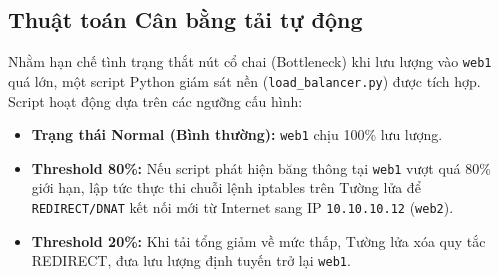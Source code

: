 \subsection{Thuật toán Cân bằng tải tự động}
Nhằm hạn chế tình trạng thắt nút cổ chai (Bottleneck) khi lưu lượng vào \texttt{web1} quá lớn, một script Python giám sát nền (\texttt{load\_balancer.py}) được tích hợp. Script hoạt động dựa trên các ngưỡng cấu hình:
\begin{itemize}
    \item \textbf{Trạng thái Normal (Bình thường):} \texttt{web1} chịu 100\% lưu lượng.
    \item \textbf{Threshold 80\%:} Nếu script phát hiện băng thông tại \texttt{web1} vượt quá 80\% giới hạn, lập tức thực thi chuỗi lệnh iptables trên Tường lửa để \texttt{REDIRECT/DNAT} kết nối mới từ Internet sang IP \texttt{10.10.10.12} (\texttt{web2}).
    \item \textbf{Threshold 20\%:} Khi tải tổng giảm về mức thấp, Tường lửa xóa quy tắc REDIRECT, đưa lưu lượng định tuyến trở lại \texttt{web1}.
\end{itemize}
